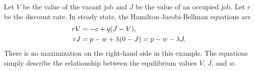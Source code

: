 \documentclass[letterpaper, 11pt, leqno]{article}
\begin{document}
Let $V$ be the value of the vacant job and $J$ be the value of an occupied job. Let $r$ be the discount rate. In steady state, the Hamilton-Jacobi-Bellman equations are
\begin{align*}
r V &=-c+q (J-V),\\
r J &=p-w+ \lambda (0-J)=p-w-\lambda J.
\end{align*}
There is no maximization on the right-hand side in this example. The equations simply describe the relationship between the equilibrium values $V$, $J$, and $w$. 
\end{document}
